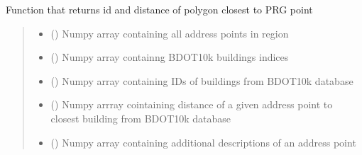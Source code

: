 \documentclass[letterpaper,10pt,english]{sphinxmanual}
\begin{document}

\begin{fulllineitems}
\label{\detokenize{geo_utilities:geo_utilities.get_bdot10k_id}}
\pysigstartsignatures
{}
\pysigstopsignatures
\sphinxAtStartPar
Function that returns id and distance of polygon closest to PRG point
\begin{quote}\begin{description}
\begin{itemize}
\item {} 
\sphinxAtStartPar
{} () \textendash{} Numpy array containing all address points in region

\item {} 
\sphinxAtStartPar
{} () \textendash{} Numpy array containng BDOT10k buildings indices

\item {} 
\sphinxAtStartPar
{} () \textendash{} Numpy array containing IDs of buildings from BDOT10k database

\item {} 
\sphinxAtStartPar
{} () \textendash{} Numpy arrray cointaining distance of a given address point to closest building from BDOT10k
database

\item {} 
\sphinxAtStartPar
{} () \textendash{} Numpy array containing additional descriptions of an address point


\end{itemize}
\end{description}
\end{quote}
\end{fulllineitems}
\end{document}
